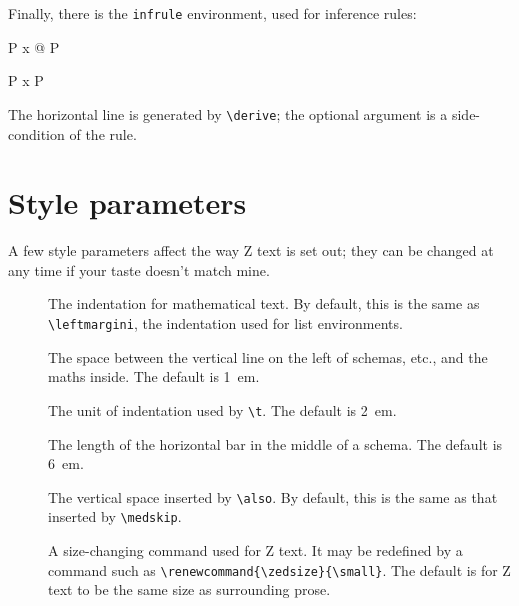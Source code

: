 Finally, there is the \verb/infrule/ environment, used for inference
rules:
\begin{demo}
\begin{infrule}
    \Gamma \vdash P
    \Gamma \vdash \forall x @ P
\end{infrule}
\gives
\begin{infrule}
    \Gamma \vdash P
    \Gamma \vdash \forall x \spot P
\end{infrule}
\end{demo}
The horizontal line is generated by \verb/\derive/; the optional
argument is a side-condition of the rule.

\section{Style parameters}\label{params}

A few style parameters affect the way Z text is set out; they can be
changed at any time if your taste doesn't match mine.%

\begin{description}
\item[\tt\string\zedindent]\index{|\zedindent|} The indentation for
        mathematical text.  By default, this is the same as
        \verb|\leftmargini|, the indentation used for list
        environments.
\item[\tt\string\zedleftsep]\index{|\zedleftsep|} The space between
        the vertical line on the left of schemas, etc., and the
        maths inside. The default is 1~em.
\item[\tt\string\zedtab]\index{|\zedtab|} The unit of indentation
        used by \verb|\t|. The default is 2~em.
\item[\tt\string\zedbar]\index{|\zedbar|} The length of the
        horizontal bar in the middle of a schema. The default is
        6~em.
\item[\tt\string\zedskip]\index{|\zedskip|} The vertical space
        inserted by \verb/\also/. By default, this is the same as
        that inserted by \verb/\medskip/.
\item[\tt\string\zedsize]\index{|\zedsize|} A size-changing command
        used for Z text.  It may be redefined by a command such as
        \verb/\renewcommand{\zedsize}{\small}/.  The default is for
        Z text to be the same size as surrounding prose.
\end{description}

